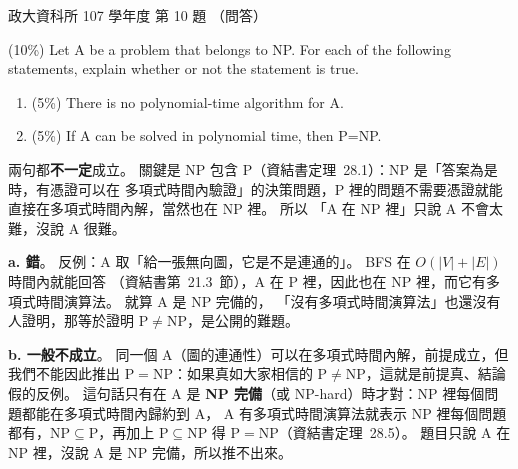\begin{pastexam}[label={px:nccu-107-dsa-10}]{政大資科所 107 學年度 第 10 題}
（問答）

(10\%) Let A be a problem that belongs to NP. For each of the following statements, explain whether
or not the statement is true.
\begin{enumerate}[label=\alph*.]
\item (5\%) There is no polynomial-time algorithm for A.
\item (5\%) If A can be solved in polynomial time, then P=NP.
\end{enumerate}
\end{pastexam}

\begin{pastsoln}
兩句都\textbf{不一定}成立。 關鍵是 NP 包含 P（資結書定理~28.1）：NP 是「答案為是時，有憑證可以在
多項式時間內驗證」的決策問題，P 裡的問題不需要憑證就能直接在多項式時間內解，當然也在 NP 裡。 所以
「A 在 NP 裡」只說 A 不會太難，沒說 A 很難。

\textbf{a. 錯}。 反例：A 取「給一張無向圖，它是不是連通的」。 BFS 在 $O(|V| + |E|)$ 時間內就能回答
（資結書第~21.3~節），A 在 P 裡，因此也在 NP 裡，而它有多項式時間演算法。 就算 A 是 NP 完備的，
「沒有多項式時間演算法」也還沒有人證明，那等於證明 $\mathrm{P} \ne \mathrm{NP}$，是公開的難題。

\textbf{b. 一般不成立}。 同一個 A（圖的連通性）可以在多項式時間內解，前提成立，但我們不能因此推出
$\mathrm{P} = \mathrm{NP}$：如果真如大家相信的 $\mathrm{P} \ne \mathrm{NP}$，這就是前提真、結論假的反例。
這句話只有在 A 是 \textbf{NP 完備}（或 NP-hard）時才對：NP 裡每個問題都能在多項式時間內歸約到 A，
A 有多項式時間演算法就表示 NP 裡每個問題都有，$\mathrm{NP} \subseteq \mathrm{P}$，再加上
$\mathrm{P} \subseteq \mathrm{NP}$ 得 $\mathrm{P} = \mathrm{NP}$（資結書定理~28.5）。 題目只說 A 在
NP 裡，沒說 A 是 NP 完備，所以推不出來。
\end{pastsoln}
